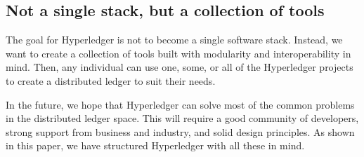 \subsection{Not a single stack, but a collection of tools}
The goal for Hyperledger is not to become a single software stack. 
Instead, we want to create a collection of tools built with modularity and interoperability in mind. 
Then, any individual can use one, some, or all of the Hyperledger projects to create a distributed ledger to suit their needs.

In the future, we hope that Hyperledger can solve most of the common problems in the distributed ledger space. 
This will require a good community of developers, strong support from business and industry, and solid design principles. 
As shown in this paper, we have structured Hyperledger with all these in mind. 

